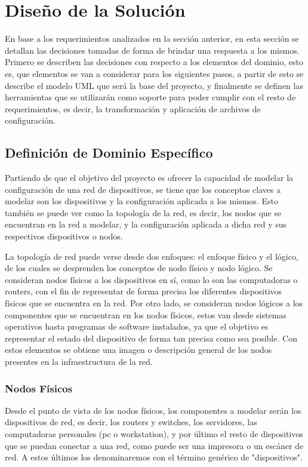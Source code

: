 \chapter{Diseño de la Solución} \label{Diseño de Solucion}

En base a los requerimientos analizados en la sección anterior, en esta sección se detallan las decisiones tomadas de forma de brindar una respuesta a los mismos. 
Primero se describen las decisiones con respecto a los elementos del dominio, esto es, que elementos se van a considerar para los siguientes pasos, a partir de esto se describe el modelo UML que será la base del proyecto, y finalmente se definen las herramientas que se utilizarán como soporte para poder cumplir con el resto de requerimientos, es decir, la transformación y aplicación de archivos de configuración.

\section{Definición de Dominio Específico} \label{Definicion de Dominio Específico}
Partiendo de que el objetivo del proyecto es ofrecer la capacidad de modelar la configuración de una red de dispositivos, se tiene que los conceptos claves a modelar son los dispositivos y la configuración aplicada a los mismos.
Esto también se puede ver como la topología de la red, es decir, los nodos que se encuentran en la red a modelar, y la configuración aplicada a dicha red y sus respectivos dispositivos o nodos.

La topología de red puede verse desde dos enfoques: el enfoque físico y el lógico, de los cuales se desprenden los conceptos de nodo físico y nodo lógico. Se consideran nodos físicos a los dispositivos en sí, como lo son las computadoras o routers, con el fin de representar de forma precisa los diferentes dispositivos físicos que se encuentra en la red. Por otro lado, se consideran nodos lógicos a los componentes que se encuentran en los nodos físicos, estos van desde sistemas operativos hasta programas de software instalados, ya que el objetivo es representar el estado del dispositivo de forma tan precisa como sea posible.
Con estos elementos se obtiene una imagen o descripción general de los nodos presentes en la infraestructura de la red.

\subsection{Nodos Físicos}
Desde el punto de vista de los nodos físicos, los componentes a modelar serán los dispositivos de red, es decir, los routers y switches, los servidores, las computadoras personales (pc o workstation), y por último el resto de dispositivos que se puedan conectar a una red, como puede ser una impresora o un escáner de red. A estos últimos los denominaremos con el término genérico de "dispositivos".

